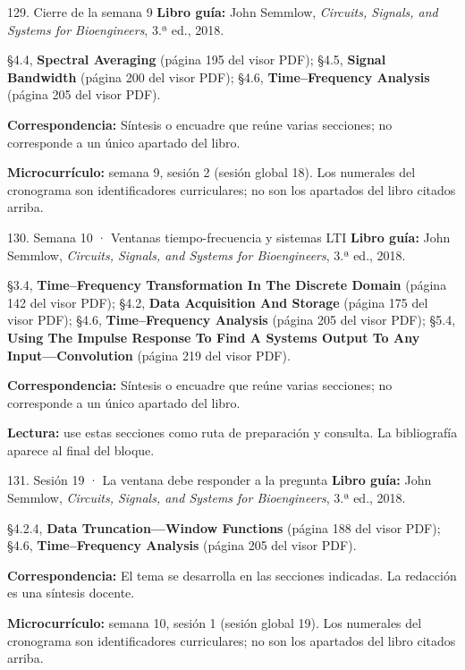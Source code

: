 \documentclass[
  10pt,
  ignorenonframetext,
  aspectratio=169,
  spanish,
]{beamer}
\begin{document}
\begin{frame}{129. Cierre de la semana 9}
\label{cierre-de-la-semana-9}
\textbf{Libro guía:} John Semmlow, \emph{Circuits, Signals, and Systems
for Bioengineers}, 3.ª ed., 2018.

§4.4, \textbf{Spectral Averaging} (página 195 del visor PDF); §4.5,
\textbf{Signal Bandwidth} (página 200 del visor PDF); §4.6,
\textbf{Time--Frequency Analysis} (página 205 del visor PDF).

\textbf{Correspondencia:} Síntesis o encuadre que reúne varias
secciones; no corresponde a un único apartado del libro.

\textbf{Microcurrículo:} semana 9, sesión 2 (sesión global 18). Los
numerales del cronograma son identificadores curriculares; no son los
apartados del libro citados arriba.
\end{frame}

\begin{frame}{130. Semana 10 · Ventanas tiempo-frecuencia y sistemas
LTI}
\label{semana-10-ventanas-tiempo-frecuencia-y-sistemas-lti}
\textbf{Libro guía:} John Semmlow, \emph{Circuits, Signals, and Systems
for Bioengineers}, 3.ª ed., 2018.

§3.4, \textbf{Time--Frequency Transformation In The Discrete Domain}
(página 142 del visor PDF); §4.2, \textbf{Data Acquisition And Storage}
(página 175 del visor PDF); §4.6, \textbf{Time--Frequency Analysis}
(página 205 del visor PDF); §5.4, \textbf{Using The Impulse Response To
Find A Systems Output To Any Input---Convolution} (página 219 del visor
PDF).

\textbf{Correspondencia:} Síntesis o encuadre que reúne varias
secciones; no corresponde a un único apartado del libro.

\textbf{Lectura:} use estas secciones como ruta de preparación y
consulta. La bibliografía aparece al final del bloque.
\end{frame}

\begin{frame}{131. Sesión 19 · La ventana debe responder a la pregunta}
\label{sesiuxf3n-19-la-ventana-debe-responder-a-la-pregunta}
\textbf{Libro guía:} John Semmlow, \emph{Circuits, Signals, and Systems
for Bioengineers}, 3.ª ed., 2018.

§4.2.4, \textbf{Data Truncation---Window Functions} (página 188 del
visor PDF); §4.6, \textbf{Time--Frequency Analysis} (página 205 del
visor PDF).

\textbf{Correspondencia:} El tema se desarrolla en las secciones
indicadas. La redacción es una síntesis docente.

\textbf{Microcurrículo:} semana 10, sesión 1 (sesión global 19). Los
numerales del cronograma son identificadores curriculares; no son los
apartados del libro citados arriba.
\end{frame}
\end{document}
